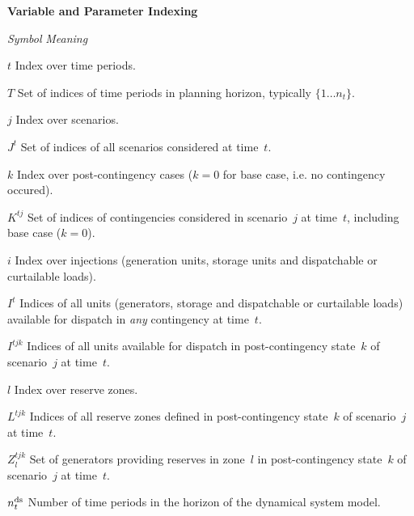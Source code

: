\documentclass[12pt]{article}
\newcommand{\namelistlabel}[1]{\mbox{#1}\hfil}
\newenvironment{namelist}[1]{%
\begin{list}{}
  {
    \let\makelabel\namelistlabel
    \settowidth{\labelwidth}{#1}
    \setlength{\leftmargin}{1.1\labelwidth}
  }
 }{%
\end{list}}
\numberwithin{equation}{section}
\numberwithin{table}{section}
\numberwithin{figure}{section}
\begin{document}
\begin{namelist}{XXXXXXXXXX}
\item[]
\item[{\bf Variable and Parameter Indexing}]
\item[\emph{Symbol}] \emph{Meaning}
\item[$t$] Index over time periods.
\item[$T$] Set of indices of time periods in planning horizon, typically $\{ 1\ldots n_t\}$.
\item[$j$] Index over scenarios.
\item[$J^t$] Set of indices of all scenarios considered at time~$t$.
\item[$k$] Index over post-contingency cases ($k = 0$ for base case, i.e. no contingency occured).
\item[$K^{tj}$] Set of indices of contingencies considered in scenario~$j$ at time~$t$, including base case ($k=0$).
\item[$i$] Index over injections (generation units, storage units and dispatchable or curtailable loads).
\item[$I^t$] Indices of all units (generators, storage and dispatchable or curtailable loads) available for dispatch in \emph{any} contingency at time~$t$.
\item[$I^{tjk}$] Indices of all units available for dispatch in post-contingency state~$k$ of scenario~$j$ at time~$t$.
\item[$l$] Index over reserve zones.
\item[$L^{tjk}$] Indices of all reserve zones defined in post-contingency state~$k$ of scenario~$j$ at time~$t$.
\item[$Z_l^{tjk}$] Set of generators providing reserves in zone~$l$ in post-contingency state~$k$ of scenario~$j$ at time~$t$.
\item[$n_t^{\rm ds}$] Number of time periods in the horizon of the dynamical system model.


\end{namelist}
\end{document}
